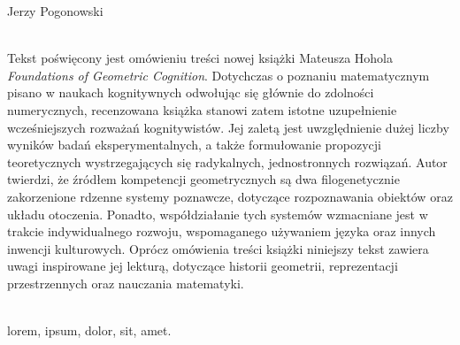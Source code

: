 \begin{newrevengenv}{Jerzy Pogonowski}




\vspace{5mm}%
\begin{flushright}
{\chaptitleeng\color{black!50}{Geometric cognition\\from a cognitive point of view}}
\end{flushright}

{}\\
{Tekst poświęcony jest omówieniu treści nowej książki Mateusza
Hohola {\em Foundations of Geometric Cognition}. Dotychczas o
poznaniu matematycznym pisano w naukach kognitywnych odwołując się
głównie do zdolności numerycznych, recenzowana książka stanowi
zatem istotne uzupełnienie wcześniejszych rozważań kognitywistów.
Jej zaletą jest uwzględnienie dużej liczby wyników badań
eksperymentalnych, a także formułowanie propozycji teoretycznych
wystrzegających się radykalnych, jednostronnych rozwiązań. Autor
twierdzi, że źródłem kompetencji geometrycznych są dwa
filogenetycznie zakorzenione rdzenne systemy poznawcze, dotyczące
rozpoznawania obiektów oraz układu otoczenia. Ponadto,
współdziałanie tych systemów wzmacniane jest w trakcie
indywidualnego rozwoju, wspomaganego używaniem języka oraz innych
inwencji kulturowych. Oprócz omówienia treści książki niniejszy
tekst zawiera uwagi inspirowane jej lekturą, dotyczące historii
geometrii, reprezentacji przestrzennych oraz nauczania matematyki.}\par%
\vspace{2mm}%
{}\\%
{lorem, ipsum, dolor, sit, amet.}%



\end{newrevengenv}
